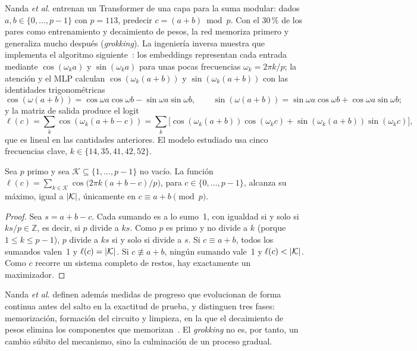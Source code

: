 Nanda \emph{et al.} entrenan un Transformer de una capa para la suma modular: dados $a,b\in\{0,\dots,p-1\}$ con $p=113$, predecir $c=(a+b)\bmod p$. Con el $30\,\%$ de los pares como entrenamiento y decaimiento de pesos, la red memoriza primero y generaliza mucho después (\emph{grokking}). La ingeniería inversa muestra que implementa el algoritmo siguiente~\cite[§3.1 y §4]{nanda}: los embeddings representan cada entrada mediante $\cos(\omega_ka)$ y $\sin(\omega_ka)$ para unas pocas frecuencias $\omega_k=2\pi k/p$; la atención y el MLP calculan $\cos(\omega_k(a+b))$ y $\sin(\omega_k(a+b))$ con las identidades trigonométricas
\[
\cos(\omega(a+b))=\cos\omega a\cos\omega b-\sin\omega a\sin\omega b,\qquad \sin(\omega(a+b))=\sin\omega a\cos\omega b+\cos\omega a\sin\omega b;
\]
y la matriz de salida produce el logit
\[
\ell(c)=\sum_k\cos(\omega_k(a+b-c))=\sum_k\bigl[\cos(\omega_k(a+b))\cos(\omega_kc)+\sin(\omega_k(a+b))\sin(\omega_kc)\bigr],
\]
que es lineal en las cantidades anteriores. El modelo estudiado usa cinco frecuencias clave, $k\in\{14,35,41,42,52\}$.

\begin{proposicion}\label{prop:fourier}
Sea $p$ primo y sea $\mathcal{K}\subseteq\{1,\dots,p-1\}$ no vacío. La función $\ell(c)=\sum_{k\in\mathcal{K}}\cos\bigl(2\pi k(a+b-c)/p\bigr)$, para $c\in\{0,\dots,p-1\}$, alcanza su máximo, igual a $\lvert\mathcal{K}\rvert$, únicamente en $c\equiv a+b\pmod p$.
\end{proposicion}

\begin{proof}
Sea $s=a+b-c$. Cada sumando es a lo sumo~1, con igualdad si y solo si $ks/p\in\mathbb{Z}$, es decir, si $p$ divide a $ks$. Como $p$ es primo y no divide a $k$ (porque $1\le k\le p-1$), $p$ divide a $ks$ si y solo si divide a $s$. Si $c\equiv a+b$, todos los sumandos valen~1 y $\ell(c)=\lvert\mathcal{K}\rvert$. Si $c\not\equiv a+b$, ningún sumando vale~1 y $\ell(c)<\lvert\mathcal{K}\rvert$. Como $c$ recorre un sistema completo de restos, hay exactamente un maximizador.
\end{proof}

Nanda \emph{et al.} definen además medidas de progreso que evolucionan de forma continua antes del salto en la exactitud de prueba, y distinguen tres fases: memorización, formación del circuito y limpieza, en la que el decaimiento de pesos elimina los componentes que memorizan~\cite[§5]{nanda}. El \emph{grokking} no es, por tanto, un cambio súbito del mecanismo, sino la culminación de un proceso gradual.

